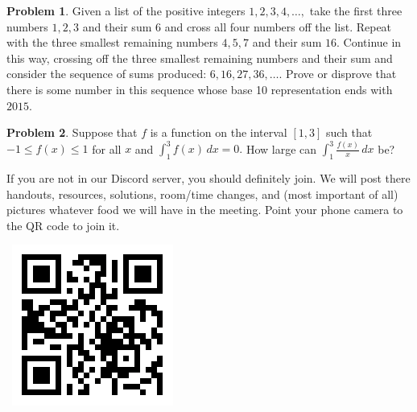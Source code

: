 \documentclass{scrartcl}
\theoremstyle{definition}
\newtheorem{prob}{Problem}
\begin{document}
	\begin{prob}%
		Given a list of the positive integers $1,2,3,4,\dots,$ take the first three numbers $1,2,3$ and their sum $6$ and cross all four numbers off the list. Repeat with the three smallest remaining numbers $4,5,7$ and their sum $16.$ Continue in this way, crossing off the three smallest remaining numbers and their sum and consider the sequence of sums produced: $6,16,27, 36, \dots.$ Prove or disprove that there is some number in this sequence whose base 10 representation ends with $2015.$
	\end{prob}

	\begin{prob}%
		Suppose that $f$ is a function on the interval $[1,3]$ such that $-1\le f(x)\le 1$ for all $x$ and $\displaystyle \int_1^3f(x)\,dx=0.$ How large can $\displaystyle\int_1^3\frac{f(x)}x\,dx$ be?
	\end{prob}

	\vfill

	\begin{minipage}{.85\textwidth}{}
		\footnotesize
		If you are not in our Discord server, you should definitely join.
		We will post there handouts, resources, solutions, room/time changes, and (most important of all) pictures whatever food we will have in the meeting. Point your phone camera to the QR code to join it.
	\end{minipage}
	\begin{minipage}{.15\textwidth}{}
		\ \hfill \includegraphics[height = .8in]{qr}
	\end{minipage}
\end{document}
